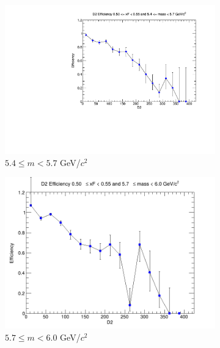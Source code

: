 \documentclass[11pt]{article}
\begin{document}
\begin{figure}[p]
\begin{subfigure}[b]{0.32\textwidth}
        \includegraphics[width=\textwidth]{./kTrackerEfficiencyPlots/D2_Efficiency_xF10_mass4.pdf}
        \caption{$5.4 \leq m < 5.7$ GeV/$c^2$}
    \end{subfigure}\hfill
    \begin{subfigure}[b]{0.32\textwidth}
        \centering
        \includegraphics[width=\textwidth]{./kTrackerEfficiencyPlots/D2_Efficiency_xF10_mass5.png}
        \caption{$5.7 \leq m < 6.0$ GeV/$c^2$}
    \end{subfigure}\vspace{0.5cm}
    \begin{subfigure}[b]{0.32\textwidth}
        \centering

\end{subfigure}
\end{figure}
\end{document}
